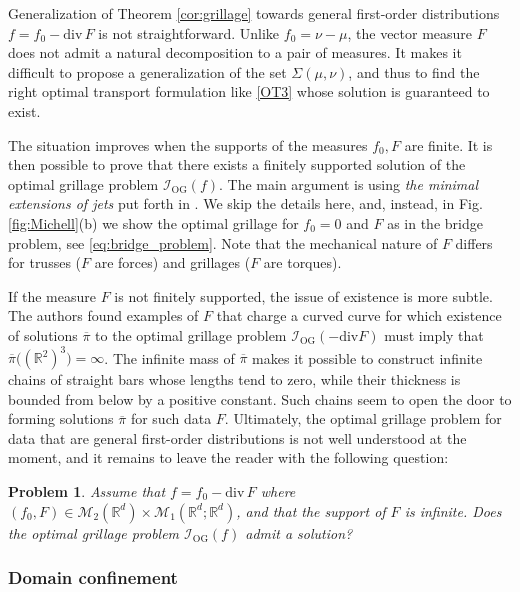 \documentclass[11pt,letterpaper,reqno]{amsart}
\newtheorem{prob}[theorem]{Problem}
\theoremstyle{definition}
\numberwithin{equation}{section}
\newcommand{\R}{\mathbb{R}}
\newcommand{\Rd}{\R^d}
\newcommand{\ov}{\overline}
\newcommand{\Mes}{{\mathcal{M}}}
\newcommand{\dive}{{\mathrm{div}}}
\newcommand{\I}{\mathcal{I}}
\begin{document}
{Generalization of Theorem \ref{cor:grillage} towards general first-order distributions $f = f_0 - \dive\, F$ is not straightforward. Unlike $f_0 = \nu -\mu$, the vector measure $F$ does not admit a natural decomposition to a pair of measures. It makes it difficult to propose a generalization of the set $\Sigma(\mu,\nu)$, and thus to find the right optimal transport formulation like \eqref{OT3} whose solution is guaranteed to exist.

The situation improves when the supports of the measures $f_0,F$ are finite. It is then possible to prove that there exists a finitely supported solution of the optimal grillage problem $\I_{\mathrm{OG}}(f)$. The main argument is using \textit{the minimal extensions of jets} put forth in \cite{legruyer2009}. We skip the details here, and, instead, in Fig. \ref{fig:Michell}(b) we show the optimal grillage for $f_0 =0$ and  $F$ as in the bridge problem, see \eqref{eq:bridge_problem}. Note that the mechanical nature of $F$ differs for trusses ($F$ are forces) and grillages ($F$ are torques).

If the measure $F$ is not finitely supported, the issue of existence is more subtle. The authors found examples of $F$ that charge a curved curve for which existence of solutions $\ov{\pi}$ to the optimal grillage problem $\I_{\mathrm{OG}}(-\dive F)$ must imply that $\ov{\pi}\big((\R^2)^3\big) = \infty$. The infinite mass of $\ov{\pi}$ makes it possible to construct  infinite chains of straight bars whose lengths tend to zero, while their thickness is bounded from below by a positive constant. Such chains seem to open the door to forming solutions $\ov{\pi}$ for such data $F$.
Ultimately, the optimal grillage problem for data that are general first-order distributions is not well understood at the moment, and it remains to leave the reader with the following question:



\begin{prob}
	Assume that $f = f_0 - \dive\, F$ where $(f_0,F) \in \Mes_2(\Rd) \times \Mes_1(\Rd;\Rd)$, and that the support of $F$ is infinite. Does  the optimal grillage problem $\I_{\mathrm{OG}}(f)$ admit a solution?
\end{prob}

\subsubsection{Domain confinement}


}
\end{document}
